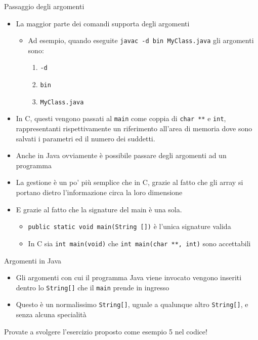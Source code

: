 \documentclass[presentation]{beamer}
\begin{document}
\begin{frame}{Passaggio degli argomenti}
	\begin{itemize}
		\item La maggior parte dei comandi supporta degli argomenti
		\begin{itemize}
			\item Ad esempio, quando eseguite \texttt{javac -d bin MyClass.java} gli argomenti sono:
			\begin{enumerate}
			 \item \texttt{-d}
			 \item \texttt{bin}
			 \item \texttt{MyClass.java}
			\end{enumerate}
		\end{itemize}
		\item In C, questi vengono passati al \texttt{main} come coppia di \texttt{char **} e \texttt{int}, rappresentanti rispettivamente un riferimento all'area di memoria dove sono salvati i parametri ed il numero dei suddetti.
		\item Anche in Java ovviamente è possibile passare degli argomenti ad un programma 
		\item La gestione è un po' più semplice che in C, grazie al fatto che gli array si portano dietro l'informazione circa la loro dimensione
		\item E grazie al fatto che la signature del main è una sola.
		\begin{itemize}
			\item \texttt{public static void main(String [])} è l'unica signature valida
			\item In C sia \texttt{int main(void)} che \texttt{int main(char **, int)} sono accettabili
		\end{itemize}
	\end{itemize}
\end{frame}

\begin{frame}{Argomenti in Java}
	\begin{itemize}
		\item Gli argomenti con cui il programma Java viene invocato vengono inseriti dentro lo \texttt{String[]} che il \texttt{main} prende in ingresso
		\item Questo è un normalissimo \texttt{String[]}, uguale a qualunque altro \texttt{String[]}, e senza alcuna specialità
	\end{itemize}
	Provate a svolgere l'esercizio proposto come esempio 5 nel codice!
\end{frame}
\end{document}
